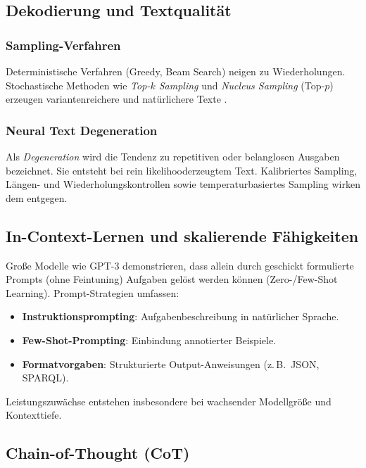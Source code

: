 \subsection{Dekodierung und Textqualität}

\subsubsection{Sampling-Verfahren}

Deterministische Verfahren (Greedy, Beam Search) neigen zu Wiederholungen. Stochastische Methoden wie \emph{Top-$k$ Sampling} und \emph{Nucleus Sampling} (Top-$p$) erzeugen variantenreichere und natürlichere Texte \cite{holtzman2020curious}.

\subsubsection{Neural Text Degeneration}

Als \emph{Degeneration} wird die Tendenz zu repetitiven oder belanglosen Ausgaben bezeichnet. Sie entsteht bei rein likelihooderzeugtem Text. Kalibriertes Sampling, Längen- und Wiederholungskontrollen sowie temperaturbasiertes Sampling wirken dem entgegen.

\subsection{In-Context-Lernen und skalierende Fähigkeiten}

Große Modelle wie GPT-3 \cite{brown2020language} demonstrieren, dass allein durch geschickt formulierte Prompts (ohne Feintuning) Aufgaben gelöst werden können (Zero-/Few-Shot Learning). Prompt-Strategien umfassen:

\begin{itemize}
    \item \textbf{Instruktionsprompting}: Aufgabenbeschreibung in natürlicher Sprache.
    \item \textbf{Few-Shot-Prompting}: Einbindung annotierter Beispiele.
    \item \textbf{Formatvorgaben}: Strukturierte Output-Anweisungen (z.\,B.\ JSON, SPARQL).
\end{itemize}

Leistungszuwächse entstehen insbesondere bei wachsender Modellgröße und Kontexttiefe.

\subsection{Chain-of-Thought (CoT)}


